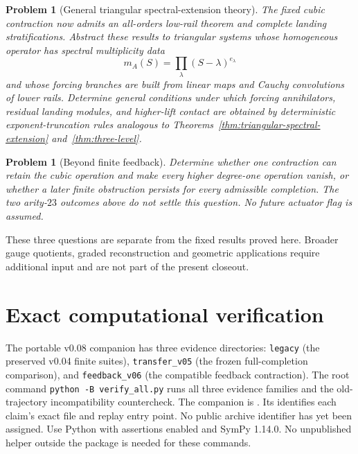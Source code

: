 \documentclass[11pt]{amsart}
\newtheorem{problem}[theorem]{Problem}
\begin{document}
\begin{problem}[General triangular spectral-extension theory]
The fixed cubic contraction now admits an all-orders low-rail theorem and complete landing stratifications.  Abstract these results to triangular systems whose homogeneous operator has spectral multiplicity data
\[
m_A(S)=\prod_\lambda(S-\lambda)^{e_\lambda}
\]
and whose forcing branches are built from linear maps and Cauchy convolutions of lower rails.  Determine general conditions under which forcing annihilators, residual landing modules, and higher-lift contact are obtained by deterministic exponent-truncation rules analogous to Theorems~\ref{thm:triangular-spectral-extension} and~\ref{thm:three-level}.
\end{problem}

\begin{problem}[Beyond finite feedback]
Determine whether one contraction can retain the cubic operation and make every
higher degree-one operation vanish, or whether a later finite obstruction
persists for every admissible completion. The two arity-$23$ outcomes above
do not settle this question. No future actuator flag is assumed.
\end{problem}

These three questions are separate from the fixed results proved here.
Broader gauge quotients, graded reconstruction and geometric applications
require additional input and are not part of the present closeout.

\appendix

\section{Exact computational verification}\label{sec:exact-verification}

The portable v0.08 companion has three evidence directories:
\texttt{legacy} (the preserved v0.04 finite suites),
\texttt{transfer\_v05} (the frozen full-completion comparison), and
\texttt{feedback\_v06} (the compatible feedback contraction).
The root command \texttt{python -B verify\_all.py} runs all three evidence
families and the old-trajectory incompatibility countercheck.
The companion is .
Its  identifies each claim's exact file and replay
entry point. No public archive identifier has yet been assigned.
Use Python with assertions enabled and SymPy 1.14.0.
No unpublished helper outside the package is needed for these commands.
\end{document}
